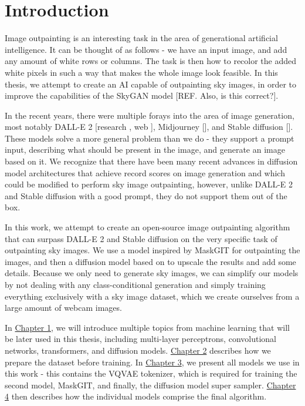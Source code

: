 \chapter*{Introduction}


Image outpainting is an interesting task in the area of generational artificial intelligence. It can be thought of as follows - we have an input image, and add any amount of white rows or columns. The task is then how to recolor the added white pixels in such a way that makes the whole image look feasible. In this thesis, we attempt to create an AI capable of outpainting sky images, in order to improve the capabilities of the SkyGAN model [REF. Also, is this correct?].

In the recent years, there were multiple forays into the area of image generation, most notably DALL-E 2 [research \citep{dalle_2}, web \citep{dalle_2_web}], Midjourney [\citep{midjourney_web}], and Stable diffusion [\citep{stable_diffusion_web}]. These models solve a more general problem than we do - they support a prompt input, describing what should be present in the image, and generate an image based on it. We recognize that there have been many recent advances in diffusion model architectures that achieve record scores on image generation and which could be modified to perform sky image outpainting, however, unlike DALL-E 2 and Stable diffusion with a good prompt, they do not support them out of the box.

In this work, we attempt to create an open-source image outpainting algorithm that can surpass DALL-E 2 and Stable diffusion on the very specific task of outpainting sky images. We use a model inspired by MaskGIT \citep{maskgit} for outpainting the images, and then a diffusion model based on \citep{diffusion_super_sampler} to upscale the results and add some details. Because we only need to generate sky images, we can simplify our models by not dealing with any class-conditional generation and simply training everything exclusively with a sky image dataset, which we create ourselves from a large amount of webcam images.

In \hyperref[background]{Chapter 1}, we will introduce multiple topics from machine learning that will be later used in this thesis, including multi-layer perceptrons, convolutional networks, transformers, and diffusion models. \hyperref[dataset]{Chapter 2} describes how we prepare the dataset before training. In \hyperref[models]{Chapter 3}, we present all models we use in this work - this contains the VQVAE tokenizer, which is required for training the second model, MaskGIT, and finally, the diffusion model super sampler. \hyperref[outpainting]{Chapter 4} then describes how the individual models comprise the final algorithm.

